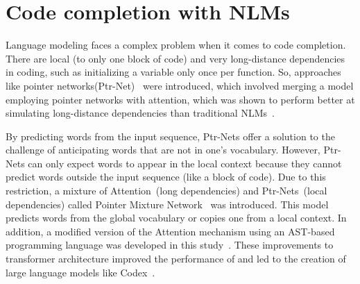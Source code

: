 \section{Code completion with NLMs}
Language modeling faces a complex problem when it comes to code completion. There are local (to only one block of code) and very long-distance dependencies in coding, such as initializing a variable only once per function. 
So, approaches like pointer networks(Ptr-Net)~\cite{pointer} were introduced, which involved merging a model employing pointer networks with attention, which was shown to perform better at simulating long-distance dependencies than traditional NLMs~\cite{ccnlm}.

By predicting words from the input sequence, Ptr-Nets offer a solution to the challenge of anticipating words that are not in one's vocabulary. However, Ptr-Nets can only expect words to appear in the local context because they cannot predict words outside the input sequence (like a block of code).
Due to this restriction, a mixture of Attention~(long dependencies) and Ptr-Nets~(local dependencies) called Pointer Mixture Network~\cite{ccnlm} was introduced. This model predicts words from the global vocabulary or copies one from a local context. 
In addition, a modified version of the Attention mechanism using an AST-based programming language was developed in this study~\cite{ccnlm}. These improvements to transformer architecture improved the performance of \cct{} and led to the creation of large language models like Codex~\cite{copilot}.



